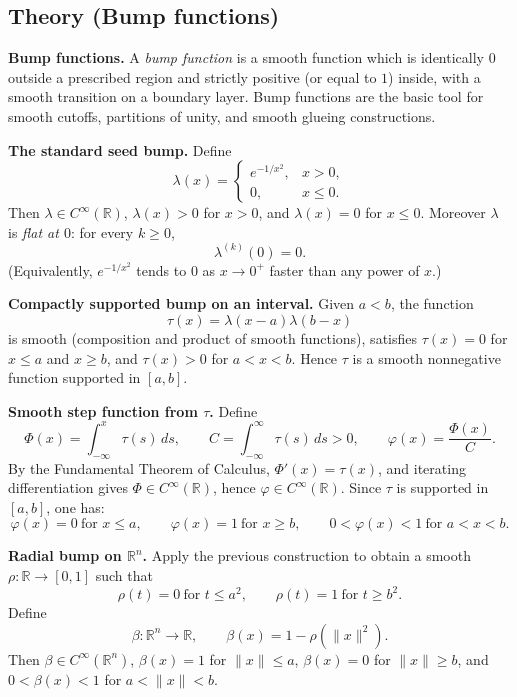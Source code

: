 \documentclass[12pt,a4paper]{article}
\theoremstyle{plain}
\theoremstyle{definition}      %
\begin{document}
\subsection*{Theory (Bump functions)}

\noindent\textbf{Bump functions.}
A \emph{bump function} is a smooth function which is identically $0$ outside a prescribed region and strictly positive (or equal to $1$)
inside, with a smooth transition on a boundary layer. Bump functions are the basic tool for smooth cutoffs, partitions of unity,
and smooth glueing constructions.

	
	\medskip
	\noindent\textbf{The standard seed bump.}
	Define
	\[
	\lambda(x)=
	\begin{cases}
		e^{-1/x^{2}}, & x>0,\\
		0, & x\le 0.
	\end{cases}
	\]
	Then $\lambda\in C^\infty(\mathbb{R})$, $\lambda(x)>0$ for $x>0$, and $\lambda(x)=0$ for $x\le 0$.
	Moreover $\lambda$ is \emph{flat at $0$}: for every $k\ge 0$,
	\[
	\lambda^{(k)}(0)=0.
	\]
	(Equivalently, $e^{-1/x^2}$ tends to $0$ as $x\to 0^+$ faster than any power of $x$.)
	
	\medskip
	\noindent\textbf{Compactly supported bump on an interval.}
	Given $a<b$, the function
	\[
	\tau(x)=\lambda(x-a)\lambda(b-x)
	\]
	is smooth (composition and product of smooth functions), satisfies $\tau(x)=0$ for $x\le a$ and $x\ge b$, and $\tau(x)>0$ for $a<x<b$.
	Hence $\tau$ is a smooth nonnegative function supported in $[a,b]$.
	
	\medskip
	\noindent\textbf{Smooth step function from $\tau$.}
	Define
	\[
	\Phi(x)=\int_{-\infty}^{x}\tau(s)\,ds,\qquad
	C=\int_{-\infty}^{\infty}\tau(s)\,ds>0,\qquad
	\varphi(x)=\frac{\Phi(x)}{C}.
	\]
	By the Fundamental Theorem of Calculus, $\Phi'(x)=\tau(x)$, and iterating differentiation gives $\Phi\in C^\infty(\mathbb{R})$,
	hence $\varphi\in C^\infty(\mathbb{R})$. Since $\tau$ is supported in $[a,b]$, one has:
	\[
	\varphi(x)=0\ \text{for }x\le a,\qquad
	\varphi(x)=1\ \text{for }x\ge b,\qquad
	0<\varphi(x)<1\ \text{for }a<x<b.
	\]
	
	\medskip
	\noindent\textbf{Radial bump on $\mathbb{R}^n$.}
	Apply the previous construction to obtain a smooth $\rho:\mathbb{R}\to[0,1]$ such that
	\[
	\rho(t)=0\ \text{for }t\le a^2,\qquad \rho(t)=1\ \text{for }t\ge b^2.
	\]
	Define
	\[
	\beta:\mathbb{R}^n\to\mathbb{R},\qquad \beta(x)=1-\rho(\|x\|^2).
	\]
	Then $\beta\in C^\infty(\mathbb{R}^n)$, $\beta(x)=1$ for $\|x\|\le a$, $\beta(x)=0$ for $\|x\|\ge b$,
	and $0<\beta(x)<1$ for $a<\|x\|<b$.
	
\end{document}
